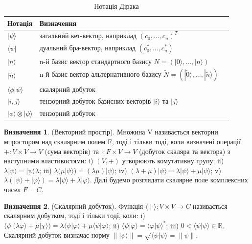 \documentclass{article}
\theoremstyle{definition}
\newtheorem{definition}{Визначення}
\begin{document}
\begin{table}[h]
\centering
  \caption{Нотація Дірака}
 \begin{tabular}{lll}
    \hline
       Нотація & Визначення \\
    \hline
       $|\psi\rangle$ & загальний кет-вектор, наприклад $(c_0,...,c_n)^T$ \\
       $\langle\psi|$ & дуальний бра-вектор, наприклад $(c_0^*,...,c_n^*)$ \\
       $|n\rangle$ & n-й базис вектор стандартного базису $N=(|0\rangle,...,|n\rangle)$\\
       $|\tilde{n}\rangle$ & n-й базис вектор альтернативного базису $\tilde{N}=(|\tilde{0}\rangle,...,|\tilde{n}\rangle)$ \\
       $\langle\phi|\psi\rangle$ & скалярний добуток \\
       $|i,j\rangle$ & тензорний добуток базисних векторів $|i\rangle$ та $|j\rangle$ \\
       $|\phi\rangle\otimes|\psi\rangle$ & тензорний добуток \\
    \hline
  \end{tabular}
\end{table}

\begin{definition} (Векторний простір). Множина V називається векторни мпростором над
скалярним полем F, тоді і тільки тоді, коли визначені операції $+ :V \times V \rightarrow V$ (сума векторів)
та $\cdot:F\times V\rightarrow V$ (добуток скаляра та вектора) з наступними властивостями:
i) $(V,+)$ утворюють комутативну групу;
ii) $\lambda |\psi\rangle = |\psi\rangle \lambda$;
iii) $\lambda(\mu|\psi\rangle) = (\lambda\mu)|\psi\rangle$;
iv) $(\lambda+\mu)|\psi\rangle = \lambda|\psi\rangle + \mu|\psi\rangle$;
v) $\lambda(|\psi\rangle+|\varphi\rangle) = \lambda|\psi\rangle + \lambda|\varphi\rangle$.
Далі будемо розглядати скалярне поле комплексних чисел $F=C$.
\end{definition}

\begin{definition} (Скалярний добуток).
Функція $\langle\cdot|\cdot\rangle:V\times V\rightarrow C$ називається скалярним
добутком, тоді і тільки тоді, коли:
i) $\langle\psi|(\lambda\varphi\rangle+\mu|\chi\rangle) = \lambda\langle\psi|\varphi\rangle+\mu\langle\psi|\varphi\rangle$;
ii) $\langle\psi|\varphi\rangle = \langle\varphi|\psi\rangle^*$;
iii) $0 < \langle\psi|\psi\rangle \in \mathbb{R}$.
Скалярний добуток визначає норму
$\parallel|\psi\rangle\parallel = \sqrt{\langle\psi|\psi\rangle} = \parallel\psi\parallel$.
\end{definition}
\end{document}

